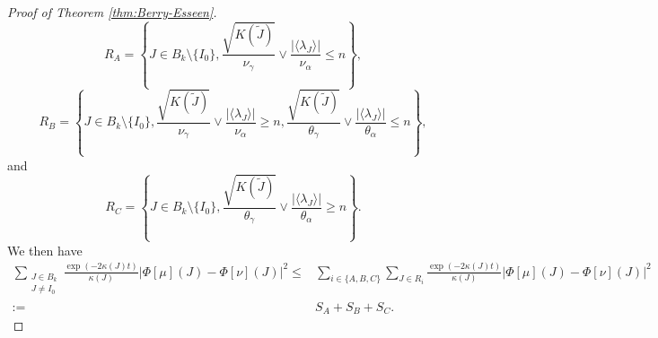 \documentclass[10pt,11pt]{amsart}%
\begin{document}
\begin{proof}[Proof of Theorem \ref{thm:Berry-Esseen}]
$$R_{A}=\left\{J\in B_{k}\setminus\{I_0\},\frac{\sqrt{K(\tilde{J})}}{\nu_{\gamma}}\vee\frac{\vert\langle \lambda_J\rangle\vert}{ \nu_{\alpha}}\leq n\right\},$$
$$R_{B}=\left\{J\in B_{k}\setminus\{I_0\},\frac{\sqrt{K(\tilde{J})}}{\nu_{\gamma}}\vee\frac{\vert\langle \lambda_J\rangle\vert}{ \nu_{\alpha}}\geq n,\frac{\sqrt{K(\tilde{J})}}{\theta_{\gamma}}\vee\frac{\vert\langle \lambda_J\rangle\vert}{ \theta_{\alpha}}\leq n\right\},$$
and 
$$R_{C}=\left\{J\in B_{k}\setminus\{I_0\},\frac{\sqrt{K(\tilde{J})}}{\theta_{\gamma}}\vee\frac{\vert\langle \lambda_J\rangle\vert}{ \theta_{\alpha}}\geq n\right\}.$$
We then have
\begin{align*}
\sum_{\substack{J\in B_{k}\\J\not=I_0}}\frac{\exp(-2\kappa(J)t)}{\kappa(J)}\left\vert \Phi[\mu](J)-\Phi[\nu](J)\right\vert^2\leq& \sum_{i\in\{A,B,C\}} \sum_{J\in R_i}\frac{\exp(-2\kappa(J)t)}{\kappa(J)}\left\vert \Phi[\mu](J)-\Phi[\nu](J)\right\vert^2\\
:=&S_A+S_B+S_C.
\end{align*}


\end{proof}
\end{document}
